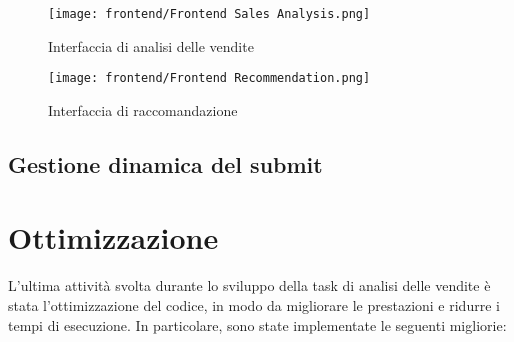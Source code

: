 \begin{figure}[!h]
    \centering
    \texttt{[image: frontend/Frontend Sales Analysis.png]}
    \caption{Interfaccia di analisi delle vendite}
    \label{fig:frontend-sales-analysis}
\end{figure}

\begin{figure}[!h]
    \centering
    \texttt{[image: frontend/Frontend Recommendation.png]}
    \caption{Interfaccia di raccomandazione}
    \label{fig:frontend-recommendation}
\end{figure}


\subsection{Gestione dinamica del submit}


\newpage

\section{Ottimizzazione}

L'ultima attività svolta durante lo sviluppo della task di analisi delle vendite è stata l'ottimizzazione del codice, in modo da migliorare le prestazioni e ridurre i tempi di esecuzione. In particolare, sono state implementate le seguenti migliorie:

